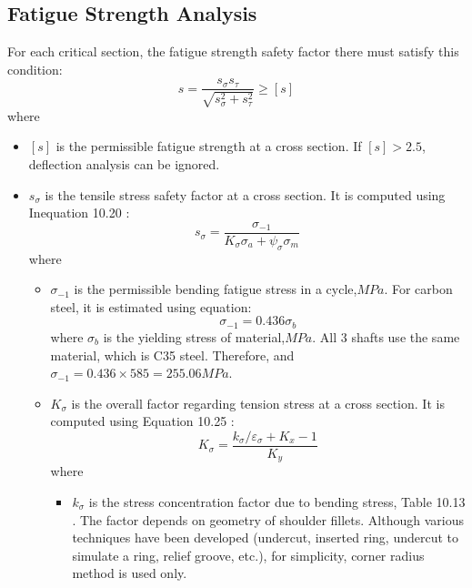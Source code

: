 \subsection{Fatigue Strength Analysis}
For each critical section, the fatigue strength safety factor there must satisfy this condition:
\[s=\dfrac{s_\sigma s_\tau}{\sqrt{s_\sigma^2+s_\tau^2}}\geq[s]\]
where
\begin{itemize}
	\item $ [s] $ is the permissible fatigue strength at a cross section. If $ [s]>2.5 $, deflection analysis can be ignored.
	\item $ s_\sigma $ is the tensile stress safety factor at a cross section. It is computed using Inequation 10.20 \cite{tk1}:
	\[
	s_\sigma = \dfrac{\sigma_{-1}}{K_\sigma\sigma_a + \psi_\sigma\sigma_m}
	\]
	where
	\begin{itemize}
		\item $ \sigma_{-1} $ is the permissible bending fatigue stress in a cycle,$ \unit{MPa} $. For carbon steel, it is estimated using equation:
		\[
		\sigma_{-1} = 0.436\sigma_b
		\]
		where $ \sigma_b $ is the yielding stress of material,$ \unit{MPa} $. All 3 shafts use the same material, which is C35 steel. Therefore, and $ \sigma_{-1} = 0.436\times 585 = 255.06\unit{MPa} $.
		\item $ K_\sigma $ is the overall factor regarding tension stress at a cross section. It is computed using Equation 10.25 \cite{tk1}:
		\[
		K_\sigma = \dfrac{k_\sigma/\varepsilon_\sigma + K_x - 1}{K_y}
		\]
		where
		\begin{itemize}
			\item $ k_\sigma $ is the stress concentration factor due to bending stress, Table 10.13 \cite{tk1}. The factor depends on geometry of shoulder fillets. Although various techniques have been developed (undercut, inserted ring, undercut to simulate a ring, relief groove, etc.), for simplicity, corner radius method is used only.
			

\end{itemize}
\end{itemize}
\end{itemize}
